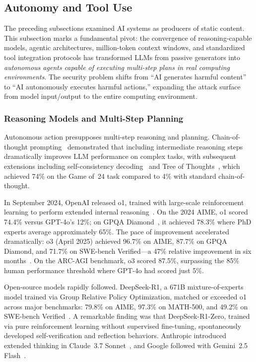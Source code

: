 \subsection{Autonomy and Tool Use}
\label{sec:cap-autonomy}

The preceding subsections examined AI systems as producers of static content. This subsection marks a fundamental pivot: the convergence of reasoning-capable models, agentic architectures, million-token context windows, and standardized tool integration protocols has transformed LLMs from passive generators into \emph{autonomous agents capable of executing multi-step plans in real computing environments}. The security problem shifts from ``AI generates harmful content'' to ``AI autonomously executes harmful actions,'' expanding the attack surface from model input/output to the entire computing environment.

\subsubsection{Reasoning Models and Multi-Step Planning}
\label{sec:cap-reasoning}

Autonomous action presupposes multi-step reasoning and planning. Chain-of-thought prompting~\cite{wei2022cot} demonstrated that including intermediate reasoning steps dramatically improves LLM performance on complex tasks, with subsequent extensions including self-consistency decoding~\cite{wang2023selfconsistency} and Tree of Thoughts~\cite{yao2023tot}, which achieved 74\% on the Game of~24 task compared to 4\% with standard chain-of-thought.

In September 2024, OpenAI released o1, trained with large-scale reinforcement learning to perform extended internal reasoning~\cite{openai2024o1}. On the 2024 AIME, o1 scored 74.4\% versus GPT-4o's 12\%; on GPQA Diamond~\cite{rein2023gpqa}, it achieved 78.3\% where PhD experts average approximately 65\%. The pace of improvement accelerated dramatically: o3 (April 2025) achieved 96.7\% on AIME, 87.7\% on GPQA Diamond, and 71.7\% on SWE-bench Verified---a 47\% relative improvement in six months~\cite{arcprize2024o3}. On the ARC-AGI benchmark, o3 scored 87.5\%, surpassing the 85\% human performance threshold where GPT-4o had scored just 5\%.

Open-source models rapidly followed. DeepSeek-R1, a 671B mixture-of-experts model trained via Group Relative Policy Optimization, matched or exceeded o1 across major benchmarks: 79.8\% on AIME, 97.3\% on MATH-500, and 49.2\% on SWE-bench Verified~\cite{deepseekr1}. A remarkable finding was that DeepSeek-R1-Zero, trained via pure reinforcement learning without supervised fine-tuning, spontaneously developed self-verification and reflection behaviors. Anthropic introduced extended thinking in Claude~3.7 Sonnet~\cite{anthropic2025thinking}, and Google followed with Gemini~2.5 Flash~\cite{google2025gemini25}.

